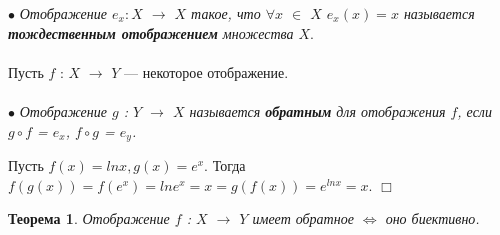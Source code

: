 \documentclass[a4paper, 12pt]{report}
\newenvironment{examp} %
{\par\noindent{\textbf{\textsc{Пример:}}}} %
{\hfill$\scriptstyle\Box$}
\begin{document}
	$\bullet$ \textit{Отображение $e_x : X$ $\rightarrow$ $X$ такое, что $\forall x$ $\in$ $X$ $e_x(x) = x$ называется \textbf{тождественным отображением} множества $X$}.\\\\
	Пусть $f$ : $X$ $\rightarrow$ $Y$ --- некоторое отображение. \\\\
	$\bullet$ \textit{Отображение $g$ : $Y$ $\rightarrow$ $X$ называется \textbf{обратным} для отображения $f$, если $g \circ f$ = $e_x$, $f \circ g$ = $e_y$.}\\
	\begin{examp}
		Пусть $f(x) = lnx, g(x) = e^x$. Тогда $f(g(x)) = f(e^x) = lne^x = x = g(f(x)) = e^{lnx} = x.$
	\end{examp}
	\newtheorem*{t6_2_2}{Теорема}\begin{t6_2_2} Отображение $f$ : $X$ $\rightarrow$ $Y$ имеет обратное $\Longleftrightarrow$ оно биективно.
	\end{t6_2_2} 
	
	
	
	
\end{document}
